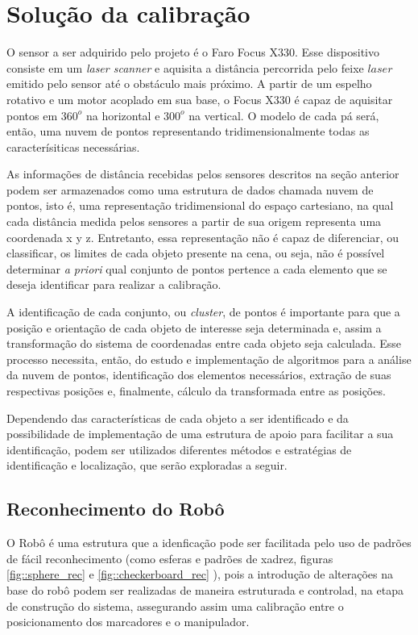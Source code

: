 \section{Solução da calibração}

O sensor a ser adquirido pelo projeto é o Faro Focus X330. Esse dispositivo
consiste em um \textit{laser scanner} e aquisita a distância percorrida pelo
feixe $laser$ emitido pelo sensor até o obstáculo mais próximo. A partir de um
espelho rotativo e um motor acoplado em sua base, o Focus X330 é capaz de
aquisitar pontos em $360^o$ na horizontal e $300^o$ na vertical. O modelo de
cada pá será, então, uma nuvem de pontos representando tridimensionalmente todas
as caracterísiticas necessárias.

As informações de distância recebidas pelos sensores descritos na seção
anterior podem ser armazenados como uma estrutura de dados chamada nuvem de
pontos, isto é, uma representação tridimensional do espaço cartesiano, na qual cada distância medida pelos
sensores a partir de sua origem representa uma coordenada x y z.
Entretanto, essa representação não é capaz de diferenciar, ou classificar, os
limites de cada objeto presente na cena, ou seja, não é possível determinar
\textit{a priori} qual conjunto de pontos pertence a cada elemento que se deseja
identificar para realizar a calibração.


A identificação de cada conjunto, ou \textit{cluster}, de pontos é importante
para que a posição e orientação de cada objeto de interesse seja determinada e,
assim a transformação do sistema de coordenadas entre cada objeto seja
calculada. Esse processo necessita, então, do estudo e implementação de
algoritmos para a análise da nuvem de pontos, identificação dos elementos
necessários, extração de suas respectivas posições e, finalmente, cálculo da
transformada entre as posições.

Dependendo das características de cada objeto a ser identificado e da
possibilidade de implementação de uma estrutura de apoio para facilitar a sua
identificação, podem ser utilizados diferentes métodos e estratégias de
identificação e localização, que serão exploradas a seguir.

\subsection{Reconhecimento do Robô}

O Robô é uma estrutura que a idenficação pode ser facilitada pelo uso de
padrões de fácil reconhecimento (como esferas e padrões de xadrez, figuras
\ref{fig::sphere_rec} e \ref{fig::checkerboard_rec} ), pois a
introdução de alterações na base do robô podem ser realizadas de maneira
estruturada e controlad, na etapa de construção do sistema, assegurando assim
uma calibração entre o posicionamento dos marcadores e o manipulador.


